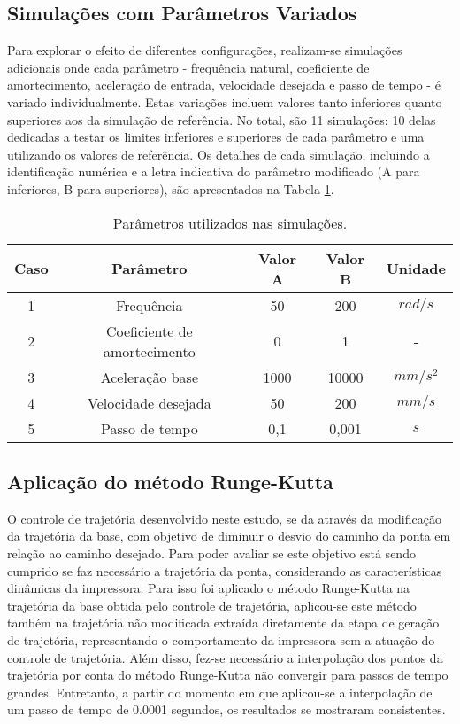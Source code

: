 \subsection{Simulações com Parâmetros Variados}
Para explorar o efeito de diferentes configurações, realizam-se simulações adicionais onde cada parâmetro - frequência natural, coeficiente de amortecimento, aceleração de entrada, velocidade desejada e  passo de tempo - é variado individualmente. Estas variações incluem valores tanto inferiores quanto superiores aos da simulação de referência. No total, são 11 simulações: 10 delas dedicadas a testar os limites inferiores e superiores de cada parâmetro e uma utilizando os valores de referência. Os detalhes de cada simulação, incluindo a identificação numérica e a letra indicativa do parâmetro modificado (A para inferiores, B para superiores), são apresentados na Tabela \ref{tab:sim_params}.

\begin{table}
    \begin{center}
    \caption{Parâmetros utilizados nas simulações.}
    \label{tab:sim_params}
    \begin{tabular}{c c c c c}
        Caso & Parâmetro & Valor A & Valor B & Unidade\\ \hline
        1 & Frequência & 50 & 200 & $rad/s$\\
        2 & Coeficiente de amortecimento & 0 & 1 & - \\
        3 & Aceleração base & 1000 & 10000 & $mm/s^2$ \\
        4 & Velocidade desejada & 50 & 200 & $mm/s$ \\
        5 & Passo de tempo & 0,1 & 0,001 & $s$ \\ \hline
    \end{tabular}
    \end{center}
\end{table}

\subsection{Aplicação do método Runge-Kutta}
O controle de trajetória desenvolvido neste estudo, se da através da modificação da trajetória da base, com objetivo de diminuir o desvio do caminho da ponta em relação ao caminho desejado. Para poder avaliar se este objetivo está sendo cumprido se faz necessário a trajetória da ponta, considerando as características dinâmicas da impressora. Para isso foi aplicado o método Runge-Kutta na trajetória da base obtida pelo controle de trajetória, aplicou-se este método também na trajetória não modificada extraída diretamente da etapa de geração de trajetória, representando o comportamento da impressora sem a atuação do controle de trajetória. Além disso, fez-se necessário a interpolação dos pontos da trajetória por conta do método Runge-Kutta não convergir para passos de tempo grandes. Entretanto, a partir do momento em que aplicou-se a interpolação de um passo de tempo de 0.0001 segundos, os resultados se mostraram consistentes.

